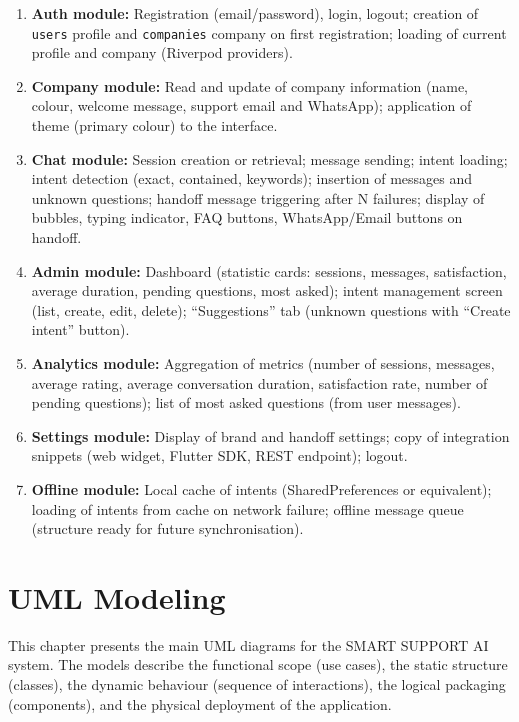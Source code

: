 \documentclass[12pt,a4paper]{report}
\begin{document}
\begin{enumerate}
  \item \textbf{Auth module:} Registration (email/password), login, logout; creation of \texttt{users} profile and \texttt{companies} company on first registration; loading of current profile and company (Riverpod providers).
  \item \textbf{Company module:} Read and update of company information (name, colour, welcome message, support email and WhatsApp); application of theme (primary colour) to the interface.
  \item \textbf{Chat module:} Session creation or retrieval; message sending; intent loading; intent detection (exact, contained, keywords); insertion of messages and unknown questions; handoff message triggering after N failures; display of bubbles, typing indicator, FAQ buttons, WhatsApp/Email buttons on handoff.
  \item \textbf{Admin module:} Dashboard (statistic cards: sessions, messages, satisfaction, average duration, pending questions, most asked); intent management screen (list, create, edit, delete); ``Suggestions'' tab (unknown questions with ``Create intent'' button).
  \item \textbf{Analytics module:} Aggregation of metrics (number of sessions, messages, average rating, average conversation duration, satisfaction rate, number of pending questions); list of most asked questions (from user messages).
  \item \textbf{Settings module:} Display of brand and handoff settings; copy of integration snippets (web widget, Flutter SDK, REST endpoint); logout.
  \item \textbf{Offline module:} Local cache of intents (SharedPreferences or equivalent); loading of intents from cache on network failure; offline message queue (structure ready for future synchronisation).
\end{enumerate}

\chapter{UML Modeling}

This chapter presents the main UML diagrams for the SMART SUPPORT AI system. The models describe the functional scope (use cases), the static structure (classes), the dynamic behaviour (sequence of interactions), the logical packaging (components), and the physical deployment of the application.
\end{document}
